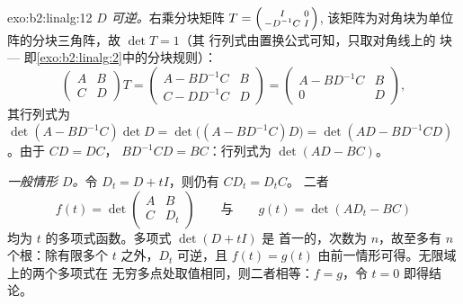 \begin{solution}{exo:b2:linalg:12}
\emph{$D$ 可逆。}右乘分块矩阵
$T = \begin{psmallmatrix} I & 0\\ -D^{-1}C & I\end{psmallmatrix}$,
该矩阵为对角块为单位阵的分块三角阵，故 $\det T = 1$（其
行列式由置换公式可知，只取对角线上的
块 --- 即\cref{exo:b2:linalg:2}中的分块规则）：
\[
\begin{pmatrix} A & B\\ C & D\end{pmatrix} T
= \begin{pmatrix} A - BD^{-1}C & B\\ C - DD^{-1}C & D\end{pmatrix}
= \begin{pmatrix} A - BD^{-1}C & B\\ 0 & D\end{pmatrix},
\]
其行列式为 $\det(A - BD^{-1}C)\det D = \det\bigl((A -
BD^{-1}C)D\bigr) = \det(AD - BD^{-1}CD)$。由于 $CD = DC$，
$BD^{-1}CD = BC$：行列式为 $\det(AD - BC)$。

\emph{一般情形 $D$。}令 $D_t = D + tI$，则仍有 $CD_t = D_tC$。
二者
\[
f(t) = \det\begin{pmatrix} A & B\\ C & D_t\end{pmatrix}
\qquad\text{与}\qquad
g(t) = \det(AD_t - BC)
\]
均为 $t$ 的多项式函数。多项式 $\det(D + tI)$ 是
首一的，次数为 $n$，故至多有 $n$ 个根：除有限多个
$t$ 之外，$D_t$ 可逆，且 $f(t) = g(t)$
由前一情形可得。无限域上的两个多项式在
无穷多点处取值相同，则二者相等：$f = g$，令 $t = 0$ 即得结论。
\end{solution}

